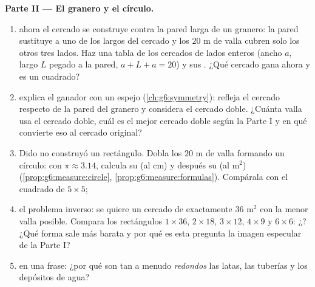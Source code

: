 \begin{problem}
\medskip
\noindent\textbf{Parte II --- El granero y el círculo.}
\begin{enumerate}[resume]
  \item ahora el cercado se construye contra la pared larga de un granero: la pared
        sustituye a uno de los largos del cercado y los $20$ m de valla
        cubren solo los otros tres lados. Haz una tabla de los
        cercados de lados enteros (ancho $a$, largo $L$ pegado a la pared,
        $a + L + a = 20$) y sus . ¿Qué cercado gana ahora
        y es un cuadrado?
  \item explica el ganador con un espejo
        (\cref{ch:g6:symmetry}): refleja el cercado respecto de la pared
        del granero y considera el cercado doble. ¿Cuánta valla usa
        el cercado doble, cuál es el mejor cercado doble según la Parte I
        y en qué convierte eso al cercado original?
  \item Dido no construyó un rectángulo. Dobla los $20$ m de valla
        formando un círculo: con $\pi \approx 3.14$, calcula su
         (al cm) y después su  (al m$^2$)
        (\cref{prop:g6:measure:circle},
        \cref{prop:g6:measure:formulas}). Compárala con el
        cuadrado de $5 \times 5$;
  \item el problema inverso: se quiere un cercado de  exactamente $36$ m$^2$
        con la menor valla posible. Compara los
        rectángulos $1 \times 36$, $2 \times 18$, $3 \times 12$,
        $4 \times 9$ y $6 \times 6$: ¿? ¿Qué forma sale
        más barata y por qué es esta pregunta la imagen especular de la
        Parte I?
  \item en una frase: ¿por qué son tan a menudo \emph{redondos} las latas, las tuberías
        y los depósitos de agua?
\end{enumerate}


\end{problem}
